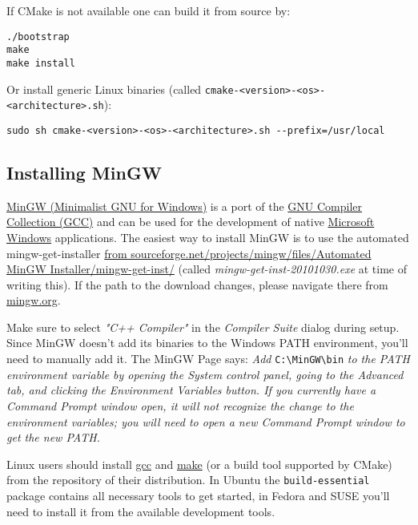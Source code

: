 If CMake is not available one can build it from source by:

\begin{lstlisting}
./bootstrap
make 
make install
\end{lstlisting}

Or install generic Linux binaries (called \lstinline|cmake-<version>-<os>-<architecture>.sh|):

\begin{lstlisting}
sudo sh cmake-<version>-<os>-<architecture>.sh --prefix=/usr/local 
\end{lstlisting}

\subsection{Installing MinGW}
\label{ssection:mingw}

\href{http://www.mingw.org}{MinGW (Minimalist GNU for Windows)} is a port of the \href{http://gcc.gnu.org}{GNU Compiler Collection (GCC)} and can be used for the development of native \href{http://www.microsoft.com/windows}{Microsoft Windows} applications. The easiest way to install MinGW is to use the automated mingw-get-installer \href{http://sourceforge.net/projects/mingw/files/Automated\%20MinGW\%20Installer/mingw-get-inst/}{from sourceforge.net/projects/mingw/files/Automated MinGW Installer/mingw-get-inst/} (called \textit{mingw-get-inst-20101030.exe} at time of writing this). If the path to the download changes, please navigate there from \href{http://www.mingw.org}{mingw.org}.

Make sure to select \textit{"C++ Compiler"} in the \textit{Compiler Suite} dialog during setup. Since MinGW doesn't add its binaries to the Windows PATH environment, you'll need to manually add it. The MinGW Page says: \textit{Add }\lstinline|C:\MinGW\bin|\textit{ to the PATH environment variable by opening the System control panel, going to the Advanced tab, and clicking the Environment Variables button. If you currently have a Command Prompt window open, it will not recognize the change to the environment variables; you will need to open a new Command Prompt window to get the new PATH.}

Linux users should install \href{http://gcc.gnu.org/}{gcc} and \href{http://www.gnu.org/software/make/}{make} (or a build tool supported by CMake) from the repository of their distribution. In Ubuntu the \lstinline|build-essential| package contains all necessary tools to get started, in Fedora and SUSE you'll need to install it from the available development tools.

